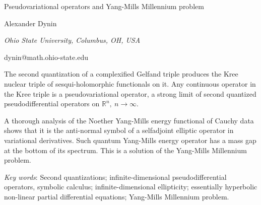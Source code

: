 \documentclass[10pt,a4paper]{article}
\begin{document}
\begin{center}

{\Large Pseudovariational operators and Yang-Mills Millennium problem}

\bigskip

\bigskip

{\sc Alexander Dynin}

{\small\it Ohio State University, Columbus, OH, USA}

{\small\rm dynin@math.ohio-state.edu}

\end{center}

\bigskip

The second quantization of a complexified Gelfand triple produces   the   Kree nuclear triple of sesqui-holomorphic functionals on it. Any continuous operator in the Kree triple  is a  pseudovariational operator, a strong limit of second quantized   pseudodifferential operators on  $\mathbb{R}^n,\ n\rightarrow \infty$. 


A thorough  analysis of the Noether Yang-Mills energy functional of Cauchy data shows that it is  the anti-normal symbol of a selfadjoint elliptic operator in variational  derivatives. Such quantum Yang-Mills energy operator  has  a mass  gap at the bottom of its  spectrum. This is a solution of the Yang-Mills Millennium problem.

\medskip
\emph{Key words}: Second quantizations; infinite-dimensional pseudodifferential operators,  symbolic calculus;  infinite-dimensional ellipticity; essentially hyperbolic non-linear partial differential  equations; Yang-Mills Millennium problem.
\end{document}

